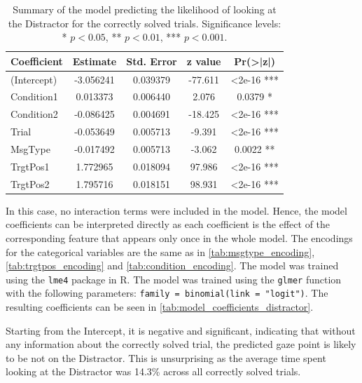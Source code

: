 \begin{table}[h!]
\centering
\begin{tabular}{|l|c|c|c|c|}
\hline
\textbf{Coefficient} & \textbf{Estimate} & \textbf{Std. Error} & \textbf{z value} & \textbf{Pr(>|z|)} \\ \hline
(Intercept)          & -3.056241         & 0.039379            & -77.611          & <2e-16 ***        \\ \hline
Condition1           & 0.013373          & 0.006440            & 2.076            & 0.0379 *          \\ \hline
Condition2           & -0.086425         & 0.004691            & -18.425          & <2e-16 ***        \\ \hline
Trial                & -0.053649         & 0.005713            & -9.391           & <2e-16 ***        \\ \hline
MsgType             & -0.017492         & 0.005713            & -3.062           & 0.0022 **         \\ \hline
TrgtPos1             & 1.772965          & 0.018094            & 97.986           & <2e-16 ***        \\ \hline
TrgtPos2             & 1.795716          & 0.018151            & 98.931           & <2e-16 ***        \\ \hline
\end{tabular}
\caption{Summary of the model predicting the likelihood of looking at the Distractor for the correctly solved trials. Significance levels: * $p < 0.05$, ** $p < 0.01$, *** $p < 0.001$.}
\label{tab:model_coefficients_distractor}
\end{table}

In this case, no interaction terms were included in the model. Hence, the model coefficients can be interpreted directly as each coefficient is the effect of the corresponding feature that appears only once in the whole model. The encodings for the categorical variables are the same as in \autoref{tab:msgtype_encoding}, \autoref{tab:trgtpos_encoding} and \autoref{tab:condition_encoding}. The model was trained using the \texttt{lme4} package in R. The model was trained using the \texttt{glmer} function with the following parameters: \texttt{family = binomial(link = "logit")}. The resulting coefficients can be seen in \autoref{tab:model_coefficients_distractor}.

Starting from the Intercept, it is negative and significant, indicating that without any information about the correctly solved trial, the predicted gaze point is likely to be not on the Distractor. This is unsurprising as the average time spent looking at the Distractor was 14.3\% across all correctly solved trials. 

